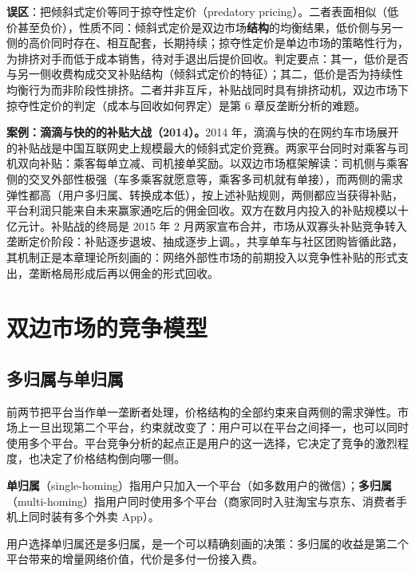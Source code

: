\begin{misconception}
\textbf{误区}：把倾斜式定价等同于掠夺性定价（predatory pricing）。二者表面相似（低价甚至负价），性质不同：倾斜式定价是双边市场\textbf{结构}的均衡结果，低价侧与另一侧的高价同时存在、相互配套，长期持续；掠夺性定价是单边市场的策略性行为，为排挤对手而低于成本销售，待对手退出后提价回收。判定要点：其一，低价是否与另一侧收费构成交叉补贴结构（倾斜式定价的特征）；其二，低价是否为持续性均衡行为而非阶段性排挤。二者并非互斥，补贴战同时具有排挤动机，双边市场下掠夺性定价的判定（成本与回收如何界定）是第 6 章反垄断分析的难题。
\end{misconception}

\textbf{案例：滴滴与快的的补贴大战（2014）。}2014 年，滴滴与快的在网约车市场展开的补贴战是中国互联网史上规模最大的倾斜式定价竞赛。两家平台同时对乘客与司机双向补贴：乘客每单立减、司机接单奖励。以双边市场框架解读：司机侧与乘客侧的交叉外部性极强（车多乘客就愿意等，乘客多司机就有单接），而两侧的需求弹性都高（用户多归属、转换成本低），按上述补贴规则，两侧都应当获得补贴，平台利润只能来自未来赢家通吃后的佣金回收。双方在数月内投入的补贴规模以十亿元计。补贴战的终局是 2015 年 2 月两家宣布合并，市场从双寡头补贴竞争转入垄断定价阶段：补贴逐步退坡、抽成逐步上调。，共享单车与社区团购皆循此路，其机制正是本章理论所刻画的：网络外部性市场的前期投入以竞争性补贴的形式支出，垄断格局形成后再以佣金的形式回收。

\section{双边市场的竞争模型}

\subsection{多归属与单归属}

前两节把平台当作单一垄断者处理，价格结构的全部约束来自两侧的需求弹性。市场上一旦出现第二个平台，约束就改变了：用户可以在平台之间择一，也可以同时使用多个平台。平台竞争分析的起点正是用户的这一选择，它决定了竞争的激烈程度，也决定了价格结构倒向哪一侧。

\begin{definition}[单归属与多归属]
\textbf{单归属}（single-homing）指用户只加入一个平台（如多数用户的微信）；\textbf{多归属}（multi-homing）指用户同时使用多个平台（商家同时入驻淘宝与京东、消费者手机上同时装有多个外卖 App）。
\end{definition}

用户选择单归属还是多归属，是一个可以精确刻画的决策：多归属的收益是第二个平台带来的增量网络价值，代价是多付一份接入费。

